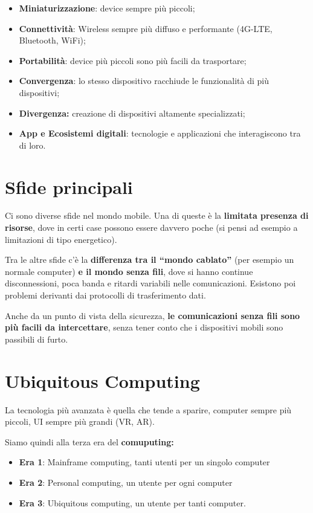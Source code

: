 \begin{itemize}
\item \textbf{Miniaturizzazione}: device sempre più piccoli;
\item \textbf{Connettività}: Wireless sempre più diffuso e performante
  (4G-LTE, Bluetooth, WiFi);
\item \textbf{Portabilità}: device più piccoli sono più facili da
  trasportare;
\item \textbf{Convergenza}: lo stesso dispositivo racchiude le funzionalità
  di più dispositivi;
\item \textbf{Divergenza:} creazione di dispositivi altamente specializzati;
\item \textbf{App e Ecosistemi digitali}: tecnologie e applicazioni che
  interagiscono tra di loro.
\end{itemize}

\section{Sfide principali}

Ci sono diverse sfide nel mondo mobile. Una di  queste è la \textbf{limitata
presenza di risorse}, dove in certi case possono essere davvero poche (si pensi
ad esempio a limitazioni di tipo energetico).

Tra le altre sfide c'è la \textbf{differenza tra il ``mondo cablato''} (per
esempio un normale computer) \textbf{e il mondo senza fili}, dove si hanno
continue disconnessioni, poca banda e ritardi variabili nelle comunicazioni.
Esistono poi problemi derivanti dai protocolli di trasferimento dati.

Anche da un punto di vista della sicurezza, \textbf{le comunicazioni senza fili
sono più facili da intercettare}, senza tener conto che i dispositivi mobili
sono passibili di furto.

\section{Ubiquitous Computing }
\label{ubiquitous-computing}

La tecnologia più avanzata è quella che tende a sparire, computer sempre
più piccoli, UI sempre più grandi (VR, AR).

Siamo quindi alla terza era del \textbf{comuputing:}

\begin{itemize}
\item \textbf{Era 1}: Mainframe computing, tanti utenti per un singolo computer
\item \textbf{Era 2}: Personal computing, un utente per ogni computer
\item \textbf{Era 3}: Ubiquitous computing, un utente per tanti computer.

\end{itemize}

